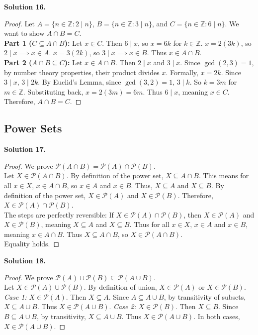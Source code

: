 \documentclass[11pt]{article}
\begin{document}
\noindent \textbf{Solution 16.}
\begin{proof}
Let $A = \{n \in \mathbb{Z} : 2 \mid n\}$, $B = \{n \in \mathbb{Z} : 3 \mid n\}$, and $C = \{n \in \mathbb{Z} : 6 \mid n\}$. We want to show $A \cap B = C$. \\
\textbf{Part 1 ($C \subseteq A \cap B$):} Let $x \in C$. Then $6 \mid x$, so $x = 6k$ for $k \in \mathbb{Z}$. $x = 2(3k)$, so $2 \mid x \implies x \in A$. $x = 3(2k)$, so $3 \mid x \implies x \in B$. Thus $x \in A \cap B$. \\
\textbf{Part 2 ($A \cap B \subseteq C$):} Let $x \in A \cap B$. Then $2 \mid x$ and $3 \mid x$. Since $\gcd(2,3) = 1$, by number theory properties, their product divides $x$. Formally, $x = 2k$. Since $3 \mid x$, $3 \mid 2k$. By Euclid's Lemma, since $\gcd(3,2)=1$, $3 \mid k$. So $k = 3m$ for $m \in \mathbb{Z}$. Substituting back, $x = 2(3m) = 6m$. Thus $6 \mid x$, meaning $x \in C$. \\
Therefore, $A \cap B = C$.
\end{proof}

\subsection{Power Sets}

\noindent \textbf{Solution 17.}
\begin{proof}
We prove $\mathcal{P}(A \cap B) = \mathcal{P}(A) \cap \mathcal{P}(B)$. \\
Let $X \in \mathcal{P}(A \cap B)$. By definition of the power set, $X \subseteq A \cap B$. This means for all $x \in X$, $x \in A \cap B$, so $x \in A$ and $x \in B$. Thus, $X \subseteq A$ and $X \subseteq B$. By definition of the power set, $X \in \mathcal{P}(A)$ and $X \in \mathcal{P}(B)$. Therefore, $X \in \mathcal{P}(A) \cap \mathcal{P}(B)$. \\
The steps are perfectly reversible: If $X \in \mathcal{P}(A) \cap \mathcal{P}(B)$, then $X \in \mathcal{P}(A)$ and $X \in \mathcal{P}(B)$, meaning $X \subseteq A$ and $X \subseteq B$. Thus for all $x \in X$, $x \in A$ and $x \in B$, meaning $x \in A \cap B$. Thus $X \subseteq A \cap B$, so $X \in \mathcal{P}(A \cap B)$. \\
Equality holds.
\end{proof}

\noindent \textbf{Solution 18.}
\begin{proof}
We prove $\mathcal{P}(A) \cup \mathcal{P}(B) \subseteq \mathcal{P}(A \cup B)$. \\
Let $X \in \mathcal{P}(A) \cup \mathcal{P}(B)$. By definition of union, $X \in \mathcal{P}(A)$ or $X \in \mathcal{P}(B)$. 
\textit{Case 1:} $X \in \mathcal{P}(A)$. Then $X \subseteq A$. Since $A \subseteq A \cup B$, by transitivity of subsets, $X \subseteq A \cup B$. Thus $X \in \mathcal{P}(A \cup B)$. 
\textit{Case 2:} $X \in \mathcal{P}(B)$. Then $X \subseteq B$. Since $B \subseteq A \cup B$, by transitivity, $X \subseteq A \cup B$. Thus $X \in \mathcal{P}(A \cup B)$. 
In both cases, $X \in \mathcal{P}(A \cup B)$.
\end{proof}
\end{document}
